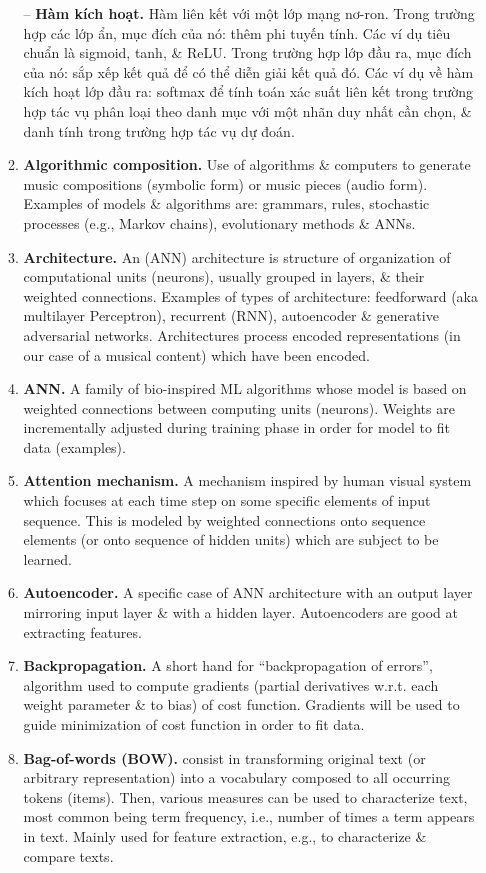 \documentclass{article}
\begin{document}
\begin{itemize}
\begin{enumerate}
		-- {\bf Hàm kích hoạt.} Hàm liên kết với một lớp mạng nơ-ron. Trong trường hợp các lớp ẩn, mục đích của nó: thêm phi tuyến tính. Các ví dụ tiêu chuẩn là sigmoid, tanh, \& ReLU. Trong trường hợp lớp đầu ra, mục đích của nó: sắp xếp kết quả để có thể diễn giải kết quả đó. Các ví dụ về hàm kích hoạt lớp đầu ra: softmax để tính toán xác suất liên kết trong trường hợp tác vụ phân loại theo danh mục với một nhãn duy nhất cần chọn, \& danh tính trong trường hợp tác vụ dự đoán.
		\item {\bf Algorithmic composition.} Use of algorithms \& computers to generate music compositions (symbolic form) or music pieces (audio form). Examples of models \& algorithms are: grammars, rules, stochastic processes (e.g., Markov chains), evolutionary methods \& ANNs.
		\item {\bf Architecture.} An (ANN) architecture is structure of organization of computational units (neurons), usually grouped in layers, \& their weighted connections. Examples of types of architecture: feedforward (aka multilayer Perceptron), recurrent (RNN), autoencoder \& generative adversarial networks. Architectures process encoded representations (in our case of a musical content) which have been encoded.
		\item {\bf ANN.} A family of bio-inspired ML algorithms whose model is based on weighted connections between computing units (neurons). Weights are incrementally adjusted during training phase in order for model to fit data (examples).
		\item {\bf Attention mechanism.} A mechanism inspired by human visual system which focuses at each time step on some specific elements of input sequence. This is modeled by weighted connections onto sequence elements (or onto sequence of hidden units) which are subject to be learned.
		\item {\bf Autoencoder.} A specific case of ANN architecture with an output layer mirroring input layer \& with a hidden layer. Autoencoders are good at extracting features.
		\item {\bf Backpropagation.} A short hand for ``backpropagation of errors'', algorithm used to compute gradients (partial derivatives w.r.t. each weight parameter \& to bias) of cost function. Gradients will be used to guide minimization of cost function in order to fit data.
		\item {\bf Bag-of-words (BOW).} consist in transforming original text (or arbitrary representation) into a vocabulary composed to all occurring tokens (items). Then, various measures can be used to characterize text, most common being term frequency, i.e., number of times a term appears in text. Mainly used for feature extraction, e.g., to characterize \& compare texts.

\end{enumerate}
\end{itemize}
\end{document}
